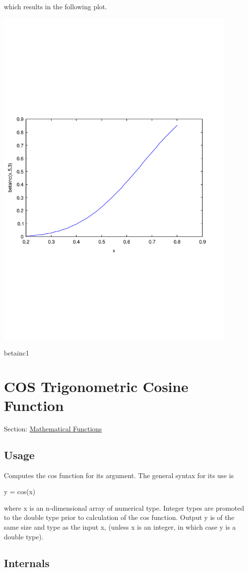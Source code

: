 which results in the following plot.  
\begin{DoxyImage}
\includegraphics[width=12cm]{betainc1}
\caption{betainc1}
\end{DoxyImage}
 \hypertarget{mathfunctions_cos}{}\section{C\-O\-S Trigonometric Cosine Function}\label{mathfunctions_cos}
Section\-: \hyperlink{sec_mathfunctions}{Mathematical Functions} \hypertarget{vtkwidgets_vtkxyplotwidget_Usage}{}\subsection{Usage}\label{vtkwidgets_vtkxyplotwidget_Usage}
Computes the {\ttfamily cos} function for its argument. The general syntax for its use is \begin{DoxyVerb}  y = cos(x)
\end{DoxyVerb}
 where {\ttfamily x} is an {\ttfamily n}-\/dimensional array of numerical type. Integer types are promoted to the {\ttfamily double} type prior to calculation of the {\ttfamily cos} function. Output {\ttfamily y} is of the same size and type as the input {\ttfamily x}, (unless {\ttfamily x} is an integer, in which case {\ttfamily y} is a {\ttfamily double} type). \hypertarget{transforms_svd_Function}{}\subsection{Internals}\label{transforms_svd_Function}
